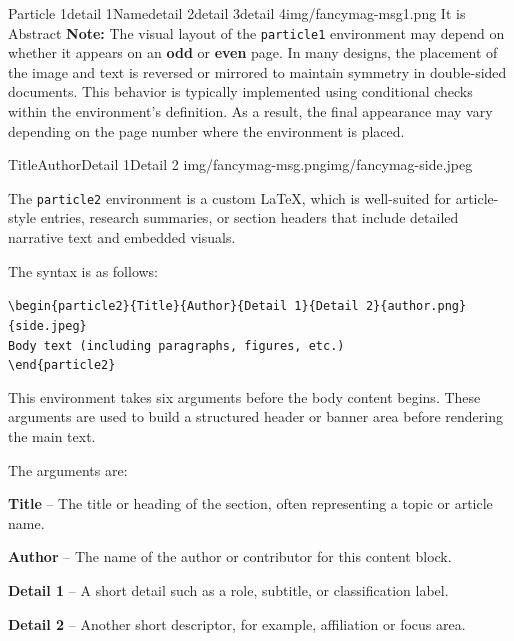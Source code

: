 \documentclass[10pt,twoside]{article}
\begin{document}
{	\begin{particle1}{Particle 1}{detail 1}{Name}{detail 2}{detail 3}{detail 4}{img/fancymag-msg1.png}
	{It is Abstract}
	{\textbf{Note:} The visual layout of the \texttt{particle1} environment may depend on whether it appears on an \textbf{odd} or \textbf{even} page. In many designs, the placement of the image and text is reversed or mirrored to maintain symmetry in double-sided documents. This behavior is typically implemented using conditional checks within the environment's definition. As a result, the final appearance may vary depending on the page number where the environment is placed.}
  	\end{particle1}
  

    \begin{particle2}{Title}{Author}{Detail 1}{Detail 2} {img/fancymag-msg.png}{img/fancymag-side.jpeg}
                
        The \texttt{particle2} environment is a custom LaTeX, which is well-suited for article-style entries, research summaries, or section headers that include detailed narrative text and embedded visuals.
        
        The syntax is as follows:
        
        \texttt{\textbackslash begin\{particle2\}\{Title\}\{Author\}\{Detail 1\}\{Detail 2\}\{author.png\}\{side.jpeg\}}\\
        \texttt{Body text (including paragraphs, figures, etc.)}\\
        \texttt{\textbackslash end\{particle2\}}
        
        This environment takes six arguments before the body content begins. These arguments are used to build a structured header or banner area before rendering the main text.
        
        The arguments are:
        
        \bullet \textbf{Title} – The title or heading of the section, often representing a topic or article name.
        
        \bullet \textbf{Author} – The name of the author or contributor for this content block.
        
        \bullet \textbf{Detail 1} – A short detail such as a role, subtitle, or classification label.
        
        \bullet \textbf{Detail 2} – Another short descriptor, for example, affiliation or focus area.
        

\end{particle2}}
\end{document}
